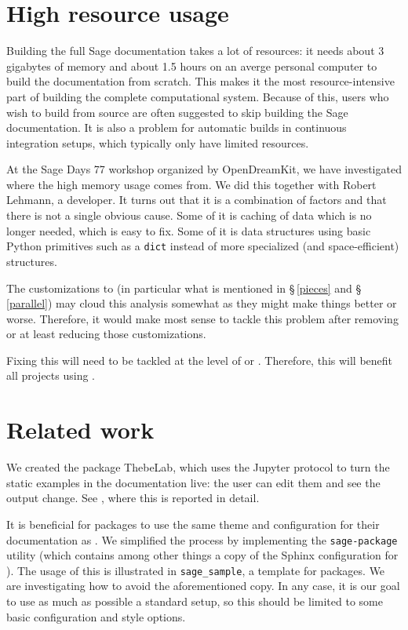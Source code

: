 \documentclass{deliverablereport}
\begin{document}
\section{High resource usage}

Building the full Sage documentation takes a lot of resources:
it needs about 3 gigabytes of memory and about 1.5 hours
on an averge personal computer to build the documentation from scratch.
This makes it the most resource-intensive part of
building the complete \Sage computational system.
Because of this, \Sage users who wish to build from source are often
suggested to skip building the Sage documentation.
It is also a problem for automatic builds in continuous integration
setups, which typically only have limited resources.

At the Sage Days 77 workshop organized by OpenDreamKit,
we have investigated where the high memory usage comes from.
We did this together with Robert Lehmann, a \Sphinx developer.
It turns out that it is a combination of factors
and that there is not a single obvious cause.
Some of it is caching of data which is no longer needed,
which is easy to fix.
Some of it is data structures using basic Python primitives such as a \texttt{dict}
instead of more specialized (and space-efficient) structures.

The \Sage customizations to \Sphinx
(in particular what is mentioned in \S\,\ref{pieces} and \S\,\ref{parallel})
may cloud this analysis somewhat
as they might make things better or worse.
Therefore, it would make most sense to tackle this problem after
removing or at least reducing those customizations.

Fixing this will need to be tackled at the level
of \Docutils or \Sphinx.
Therefore, this will benefit all projects using \Sphinx.

\section{Related work}

We created the package ThebeLab, which uses the Jupyter protocol
to turn the static examples in the documentation live:
the user can edit them and see the output change.
See , where this is reported in detail.

It is beneficial for \Sage packages to use the same theme
and configuration for their documentation as \Sage.
We simplified the process by implementing the \verb/sage-package/ utility
(which contains among other things a copy of the Sphinx configuration for \Sage).
The usage of this is illustrated in \verb/sage_sample/,
a template for \Sage packages.
We are investigating how to avoid the aforementioned copy.
In any case, it is our goal to use as much as possible a standard \Sphinx setup,
so this should be limited to some basic configuration and style options.
\end{document}
